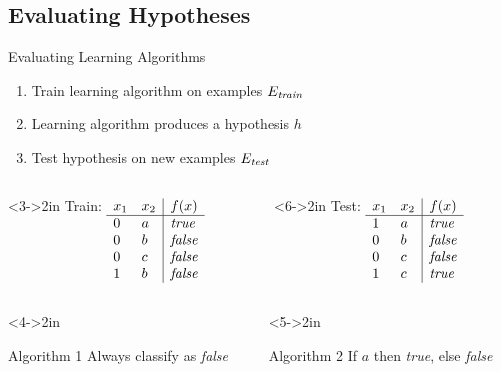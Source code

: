 \documentclass[14pt]{beamer}
\begin{document}
\subsection{Evaluating Hypotheses}

\begin{frame}{Evaluating Learning Algorithms}
\begin{enumerate}
\item Train learning algorithm on examples $E_{\textit{\scriptsize train}}$
\item Learning algorithm produces a hypothesis $h$
\item Test hypothesis on new examples $E_{\textit{\scriptsize test}}$ 
\end{enumerate}
\begin{columns}
\begin{column}<3->{2in}
Train:
$
\begin{array}[t]{ll|l}
x_1 & x_2 & f(x) \\
\hline
0   & a   & \textit{true} \\
0   & b   & \textit{false} \\
0   & c   & \textit{false} \\
1   & b   & \textit{false} \\
\end{array}
$
\end{column}
\begin{column}<6->{2in}
Test:
$
\begin{array}[t]{ll|l}
x_1 & x_2 & f(x) \\
\hline
1   & a   & \textit{true} \\
0   & b   & \textit{false} \\
0   & c   & \textit{false} \\
1   & c   & \textit{true} \\
\end{array}
$
\end{column}
\end{columns}
\begin{columns}
\begin{column}<4->{2in}
\begin{block}{Algorithm 1}
Always classify as \textit{false}
\\
 
\end{block}
\end{column}
\begin{column}<5->{2in}
\begin{block}{Algorithm 2}
If $a$ then \textit{true}, else \textit{false}
\\
 
\end{block}
\end{column}
\end{columns}
\end{frame}
\end{document}
